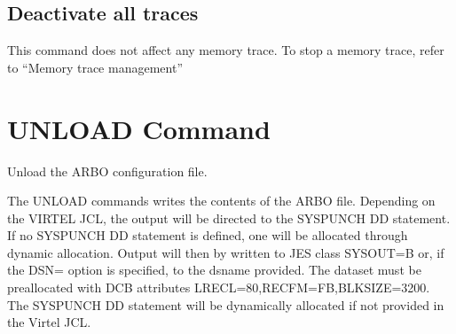 \documentclass[letterpaper,10pt,english]{sphinxmanual}
\begin{document}
\ignorespaces 

\subsection{Deactivate all traces}
\label{\detokenize{audit_operations_ and_performance:deactivate-all-traces}}\label{\detokenize{audit_operations_ and_performance:index-31}}
\begin{sphinxVerbatim}[commandchars=\\\{\}]
\end{sphinxVerbatim}

\sphinxAtStartPar
This command does not affect any memory trace. To stop a memory trace, refer to “Memory trace management”

\ignorespaces 

\section{UNLOAD Command}
\label{\detokenize{audit_operations_ and_performance:unload-command}}\label{\detokenize{audit_operations_ and_performance:index-32}}
\sphinxAtStartPar
Unload the ARBO configuration file.

\begin{sphinxVerbatim}[commandchars=\\\{\}]
\end{sphinxVerbatim}

\sphinxAtStartPar
The UNLOAD commands writes the contents of the ARBO file. Depending on the VIRTEL JCL, the output will be directed to the SYSPUNCH DD statement. If no SYSPUNCH DD statement is defined, one will be allocated through dynamic allocation. Output will then by written to JES class SYSOUT=B or, if the DSN= option is specified, to the dsname provided. The dataset must be pre\sphinxhyphen{}allocated with DCB attributes LRECL=80,RECFM=FB,BLKSIZE=3200. The SYSPUNCH DD statement will be dynamically allocated if not provided in the Virtel JCL.

\ignorespaces 
\end{document}
